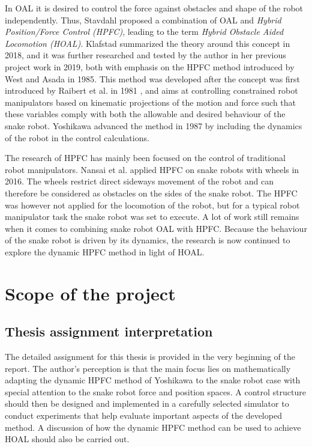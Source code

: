 
In OAL it is desired to control the force against obstacles and shape of the robot independently. Thus, Stavdahl \cite{StavdahlNote} proposed a combination of OAL and \textit{Hybrid Position/Force Control (HPFC)}, leading to the term \textit{Hybrid Obstacle Aided Locomotion (HOAL)}. Klafstad \cite{TorjusOppg} summarized the theory around this concept in 2018, and it was further researched and tested by the author in her previous project work \cite{AtussaProsjektoppgp} in 2019, both with emphasis on the HPFC method introduced by West and Asada \cite{west1985method} in 1985. This method was developed after the concept was first introduced by Raibert et al. in 1981 \cite{raibert1981hybrid}, and aims at controlling constrained robot manipulators based on kinematic projections of the motion and force such that these variables comply with both the allowable and desired behaviour of the snake robot. Yoshikawa \cite{yoshikawa1987dynamic} advanced the method in 1987 by including the dynamics of the robot in the control calculations.

The research of HPFC has mainly been focused on the control of traditional robot manipulators. Nansai et al. \cite{nansai2016dynamic} applied HPFC on snake robots with wheels in 2016. The wheels restrict direct sideways movement of the robot and can therefore be considered as obstacles on the sides of the snake robot. The HPFC was however not applied for the locomotion of the robot, but for a typical robot manipulator task the snake robot was set to execute. A lot of work still remains when it comes to combining snake robot OAL with HPFC. Because the behaviour of the snake robot is driven by its dynamics, the research is now continued to explore the dynamic HPFC method in light of HOAL.



\section{Scope of the project}

\subsection{Thesis assignment interpretation}

The detailed assignment for this thesis is provided in the very beginning of the report. The author's perception is that the main focus lies on mathematically adapting the dynamic HPFC method of Yoshikawa \cite{yoshikawa1987dynamic} to the snake robot case with special attention to the snake robot force and position spaces. A control structure should then be designed and implemented in a carefully selected simulator to conduct experiments that help evaluate important aspects of the developed method. A discussion of how the dynamic HPFC method can be used to achieve HOAL should also be carried out.

